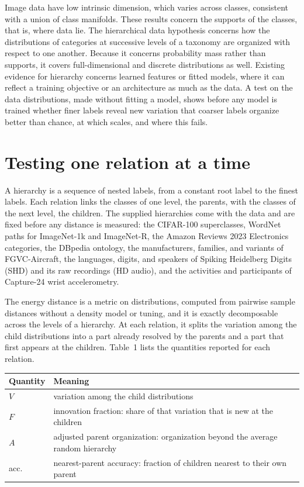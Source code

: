 \documentclass[11pt]{article}
\begin{document}
Image data have low intrinsic dimension, which varies across classes, consistent with a union of class manifolds. These results concern the supports of the classes, that is, where data lie. The hierarchical data hypothesis concerns how the distributions of categories at successive levels of a taxonomy are organized with respect to one another. Because it concerns probability mass rather than supports, it covers full-dimensional and discrete distributions as well. Existing evidence for hierarchy concerns learned features or fitted models, where it can reflect a training objective or an architecture as much as the data. A test on the data distributions, made without fitting a model, shows before any model is trained whether finer labels reveal new variation that coarser labels organize better than chance, at which scales, and where this fails.

\section{Testing one relation at a time}

A hierarchy is a sequence of nested labels, from a constant root label to the finest labels. Each relation links the classes of one level, the parents, with the classes of the next level, the children. The supplied hierarchies come with the data and are fixed before any distance is measured: the CIFAR-100 superclasses, WordNet paths for ImageNet-1k and ImageNet-R, the Amazon Reviews 2023 Electronics categories, the DBpedia ontology, the manufacturers, families, and variants of FGVC-Aircraft, the languages, digits, and speakers of Spiking Heidelberg Digits (SHD) and its raw recordings (HD audio), and the activities and participants of Capture-24 wrist accelerometry.

The energy distance is a metric on distributions, computed from pairwise sample distances without a density model or tuning, and it is exactly decomposable across the levels of a hierarchy. At each relation, it splits the variation among the child distributions into a part already resolved by the parents and a part that first appears at the children. Table~1 lists the quantities reported for each relation.

\begin{tabular}{@{}ll@{}}
\toprule
Quantity & Meaning \\
\midrule
$V$ & variation among the child distributions \\
$F$ & innovation fraction: share of that variation that is new at the children \\
$A$ & adjusted parent organization: organization beyond the average random hierarchy \\
acc. & nearest-parent accuracy: fraction of children nearest to their own parent \\
\bottomrule
\end{tabular}
\end{document}
